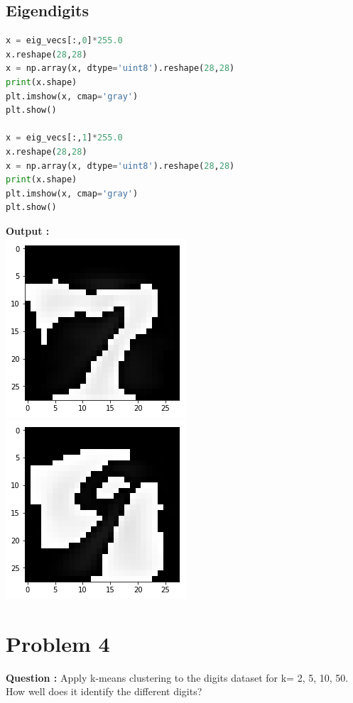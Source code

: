 \documentclass[a4paper, 11pt]{article}
\begin{document}
\subsection*{Eigendigits}
\begin{lstlisting}[language=python]
x = eig_vecs[:,0]*255.0
x.reshape(28,28)
x = np.array(x, dtype='uint8').reshape(28,28)
print(x.shape)
plt.imshow(x, cmap='gray')
plt.show()

x = eig_vecs[:,1]*255.0
x.reshape(28,28)
x = np.array(x, dtype='uint8').reshape(28,28)
print(x.shape)
plt.imshow(x, cmap='gray')
plt.show()
\end{lstlisting}
\clearpage
\textbf{Output :}\\
\includegraphics[scale=0.8]{eigendigit7}
\includegraphics[scale=0.8]{eigendigit9}

\clearpage

\section*{Problem 4}

\textbf{Question :} Apply k-means clustering to the digits dataset for k= 2, 5, 10, 50. How well does it identify the different digits?
\end{document}
